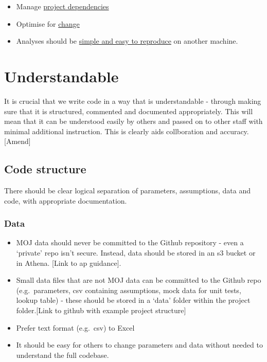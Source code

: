 \documentclass[]{book}
\providecommand{\tightlist}{%
  \setlength{\itemsep}{0pt}\setlength{\parskip}{0pt}}
\begin{document}
\begin{itemize}
\tightlist
\item
  Manage \protect\hyperlink{projdep}{project dependencies}
\item
  Optimise for \protect\hyperlink{change}{change}\\
\item
  Analyses should be \protect\hyperlink{githash}{simple and easy to reproduce} on another machine.
\end{itemize}

\hypertarget{understand}{%
\section{Understandable}\label{understand}}

It is crucial that we write code in a way that is understandable - through making sure that it is structured, commented and documented appropriately. This will mean that it can be understood easily by others and passed on to other staff with minimal additional instruction. This is clearly aids collboration and accuracy. {[}Amend{]}

\hypertarget{structure2}{%
\subsection{Code structure}\label{structure2}}

There should be clear logical separation of parameters, assumptions, data and code, with appropriate documentation.

\hypertarget{data}{%
\subsubsection*{Data}\label{data}}

\begin{itemize}
\item
  MOJ data should never be committed to the Github repository - even a `private' repo isn't secure. Instead, data should be stored in an s3 bucket or in Athena. {[}Link to ap guidance{]}.
\item
  Small data files that are not MOJ data can be committed to the Github repo (e.g.~parameters, csv containing assumptions, mock data for unit tests, lookup table) - these should be stored in a `data' folder within the project folder.{[}Link to github with example project structure{]}
\item
  Prefer text format (e.g.~csv) to Excel\\
\item
  It should be easy for others to change parameters and data without needed to understand the full codebase.
\end{itemize}
\end{document}
